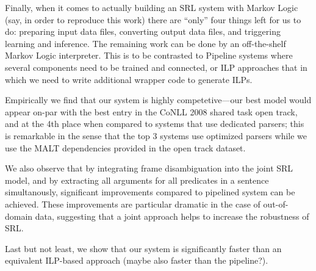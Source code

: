 Finally, when it comes to actually building an SRL system with Markov
Logic (say, in order to reproduce this work) there are ``only''
four things left for us to do: preparing input data files, converting
output data files, and triggering learning and inference. The remaining
work can be done by an off-the-shelf Markov Logic interpreter. This
is to be contrasted to Pipeline systems where several components need
to be trained and connected, or ILP approaches that in which we need
to write additional wrapper code to generate ILPs.

Empirically we find that our system is highly competetive---our best
model would appear on-par with the best entry in the CoNLL 2008
shared task open track, and at the 4th place when compared to systems
that use dedicated parsers; this is remarkable in the sense that the
top 3 systems use optimized parsers while we use the MALT
dependencies provided in the open track dataset.  

We also observe that by integrating frame disambiguation into the
joint SRL model, and by extracting all arguments for all predicates in a
sentence simultanously, significant improvements compared to pipelined
system can be achieved. These improvements are particular dramatic in
the case of out-of-domain data, suggesting that a joint approach helps
to increase the robustness of SRL. 

Last but not least, we show that our system is significantly faster
than an equivalent ILP-based approach (maybe also faster than the
pipeline?). 

 


